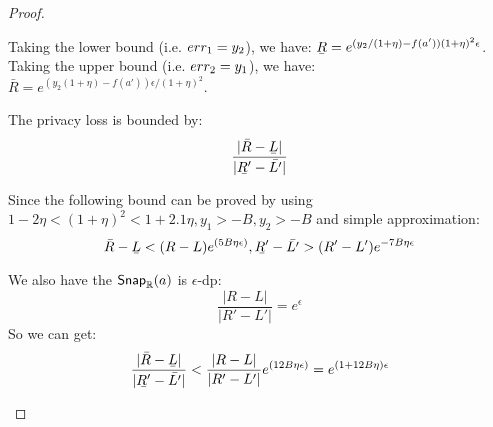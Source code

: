 \documentclass[a4paper,11pt]{article}
\begin{document}
\begin{proof}
\begin{itemize}
		Taking the lower bound (i.e. $err_1 = y_2$), we have:
		$\ubar{R} = e^{(y_2 / (1 + \eta) - f(a'))(1 + \eta)^2\epsilon}$.
		Taking the upper bound (i.e. $err_2 = y_1$), we have:
		$\bar{R} = e^{(y_2 (1 + \eta) - f(a'))\epsilon/(1 + \eta)^2}$.

		The privacy loss is bounded by:
		\[
		\frac{|\bar{R} - \ubar{L}|}{|\ubar{R'} - \bar{L'}|}
		\]

		Since the following bound can be proved by using $1 - 2\eta < (1 + \eta)^2 < 1 + 2.1\eta, y_1 > -B, y_2 > -B $ and simple approximation:
		\[
		\bar{R} - \ubar{L} < (R - L) e^{(5B\eta\epsilon)}, 
		\ubar{R'} - \bar{L'} > (R'  - L') e^{-7B\eta \epsilon}
		\]

		We also have the $\mathsf{Snap}_{\mathbb{R}}(a)$ is $\epsilon$-dp:
		\[
		\frac{|R - L|}{|R' - L'|} = e^{\epsilon}
		\]
		So we can get:
		\[
		\frac{|\bar{R} - \ubar{L}|}{|\ubar{R'} - \bar{L'}|}
		< \frac{|R - L|}{|R' - L'|} e^{(12B\eta\epsilon)}
		= e^{(1 + 12B\eta)\epsilon}
		\]		
%
%


\end{itemize}
\end{proof}
\end{document}

